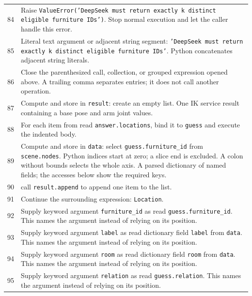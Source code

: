 \documentclass[11pt,a4paper]{book}
\begin{document}
\begin{longtable}{r p{}}
84 & Raise \texttt{ValueError('DeepSeek must return exactly k distinct eligible furniture IDs')}. Stop normal execution and let the caller handle this error. \\

85 & Literal text argument or adjacent string segment: \texttt{'DeepSeek must return exactly k distinct eligible furniture IDs'}. Python concatenates adjacent string literals. \\

86 & Close the parenthesized call, collection, or grouped expression opened above. A trailing comma separates entries; it does not call another operation. \\

87 & Compute and store in \texttt{result}: create an empty list. One IK service result containing a base pose and arm joint values. \\

88 & For each item from read \texttt{answer.locations}, bind it to \texttt{guess} and execute the indented body. \\

89 & Compute and store in \texttt{data}: select \texttt{guess.furniture\_id} from \texttt{scene.nodes}. Python indices start at zero; a slice end is excluded. A colon without bounds selects the whole axis. A parsed dictionary of named fields; the accesses below show the required keys. \\

90 & call \texttt{result.append} to append one item to the list. \\

91 & Continue the surrounding expression: \texttt{Location}. \\

92 & Supply keyword argument \texttt{furniture\_id} as read \texttt{guess.furniture\_id}. This names the argument instead of relying on its position. \\

93 & Supply keyword argument \texttt{label} as read dictionary field \texttt{label} from \texttt{data}. This names the argument instead of relying on its position. \\

94 & Supply keyword argument \texttt{room} as read dictionary field \texttt{room} from \texttt{data}. This names the argument instead of relying on its position. \\

95 & Supply keyword argument \texttt{relation} as read \texttt{guess.relation}. This names the argument instead of relying on its position. \\


\end{longtable}
\end{document}
